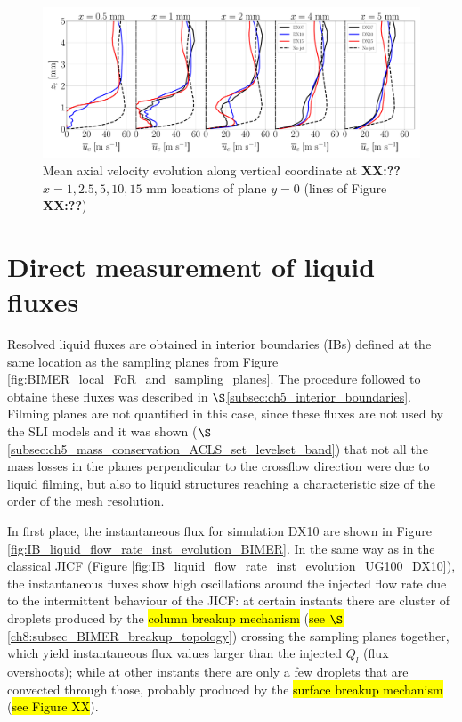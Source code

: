 \begin{figure}[ht]
\centering
   \includegraphics[scale=0.24]{./part3_applications/figures_ch8_resolved/turbulent_structures/lines_y0_along_z_ux_mean}
\caption{Mean axial velocity evolution along vertical coordinate at \textbf{XX:??} $x = 1, 2.5, 5, 10, 15$ mm locations of plane $y = 0$ (lines of Figure \textbf{XX:??})}
\label{fig:BIMER_sps_lines_y0_along_z_ux_mean}
\end{figure}

\clearpage

\section{Direct measurement of liquid fluxes}

Resolved liquid fluxes are obtained in  interior boundaries (IBs) defined at the same location as the sampling planes from Figure \ref{fig:BIMER_local_FoR_and_sampling_planes}. The procedure followed to obtaine these fluxes was described in $\S$\ref{subsec:ch5_interior_boundaries}. Filming planes are not quantified in this case, since these fluxes are not used by the SLI models and it was shown ($\S$\ref{subsec:ch5_mass_conservation_ACLS_set_levelset_band}) that not all the mass losses in the planes perpendicular to the crossflow direction were due to liquid filming, but also to liquid structures reaching a characteristic size of the order of the mesh resolution.

In first place, the instantaneous flux for simulation DX10 are shown in Figure \ref{fig:IB_liquid_flow_rate_inst_evolution_BIMER}. In the same way as in the classical JICF (Figure \ref{fig:IB_liquid_flow_rate_inst_evolution_UG100_DX10}), the instantaneous fluxes show high oscillations around the injected flow rate due to the intermittent behaviour of the JICF: at certain instants there are cluster of droplets produced by the \hl{column breakup mechanism} (\hl{see $\S$}\ref{ch8:subsec_BIMER_breakup_topology}) crossing the sampling planes together, which yield instantaneous flux values larger than the injected $Q_l$ (flux overshoots); while at other instants there are only a few droplets that are convected through those, probably produced by the \hl{surface breakup mechanism} (\hl{see Figure XX}). 




